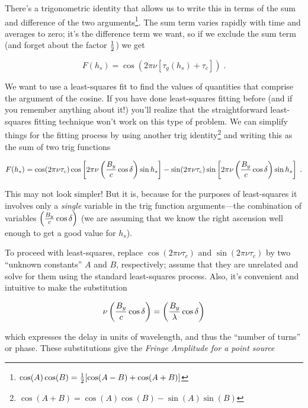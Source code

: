 \documentclass[11pt,preprint]{aastex}
\begin{document}
\noindent There's a trigonometric identity that allows us to write this
in terms of the sum and difference of the two
arguments\footnote{$\cos(A) \cos(B)= {1 \over 2}[\cos(A-B) +
\cos(A+B)]$}. The sum term varies rapidly with time and averages to zero;
it's the difference term we want, so if we exclude the sum term (and
forget about the factor $1 \over 2$) we get

\begin{equation}
 F(h_s) = \cos (2 \pi \nu [\tau_{g}(h_s) + \tau_c]) \; . 
\end{equation}


	We want to use a least-squares fit to find the values of
quantities that comprise the argument of the cosine.  If you have done
least-squares fitting before (and if you remember anything about it!)
you'll realize that the straightforward least-squares fitting technique
won't work on this type of problem.  We can simplify things for the
fitting process by using another trig identity\footnote{$\cos(A+B) =
\cos(A)\cos(B) - \sin(A)\sin(B)$} and writing this as the
sum of two trig functions

\begin{equation}
 F(h_s) = \cos(2 \pi \nu \tau_c) \cos \left[2 \pi \nu \left({B_y \over c}
	\cos\delta \right) \sin h_s\right] - \sin(2 \pi \nu \tau_c) 
	\sin \left[ 2 \pi \nu \left({B_y \over c}\cos\delta \right) \sin h_s\right] \; .  
\end{equation}


\noindent This may not look simpler! But it is, because for the purposes
of least-squares it involves only a {\it single} variable in the trig
function arguments---the combination of variables $\left({B_y \over c}
\cos\delta \right)$ (we are assuming that we know the right ascension
well enough to get a good value for $h_s$). 

	To proceed with least-squares, replace $\cos (2 \pi \nu \tau_c)$
and $\sin (2 \pi \nu \tau_c)$ by two ``unknown constants'' $A$ and $B$,
respectively; assume that they are unrelated and solve for them using
the standard least-squares process. Also, it's convenient and intuitive
to make the substitution 

\begin{equation}
\nu \left( {B_y \over c} \cos \delta \right) = \left( {B_y \over \lambda}
\cos \delta \right)
\end{equation}

\noindent which expresses the delay in units of wavelength, and thus the
``number of turns'' or phase. These substitutions give the {\it Fringe
  Amplitude for a point source}
\end{document}
